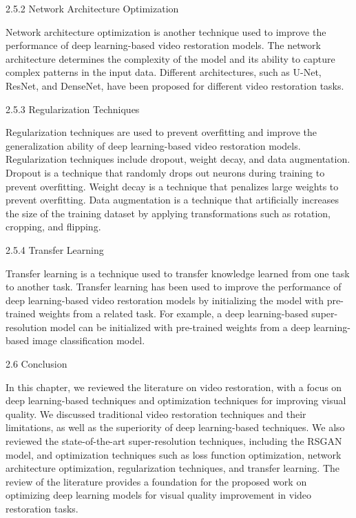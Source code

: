 2.5.2 Network Architecture Optimization

Network architecture optimization is another technique used to improve the performance of deep learning-based video restoration models. The network architecture determines the complexity of the model and its ability to capture complex patterns in the input data. Different architectures, such as U-Net, ResNet, and DenseNet, have been proposed for different video restoration tasks.

2.5.3 Regularization Techniques

Regularization techniques are used to prevent overfitting and improve the generalization ability of deep learning-based video restoration models. Regularization techniques include dropout, weight decay, and data augmentation. Dropout is a technique that randomly drops out neurons during training to prevent overfitting. Weight decay is a technique that penalizes large weights to prevent overfitting. Data augmentation is a technique that artificially increases the size of the training dataset by applying transformations such as rotation, cropping, and flipping.

2.5.4 Transfer Learning

Transfer learning is a technique used to transfer knowledge learned from one task to another task. Transfer learning has been used to improve the performance of deep learning-based video restoration models by initializing the model with pre-trained weights from a related task. For example, a deep learning-based super-resolution model can be initialized with pre-trained weights from a deep learning-based image classification model.

2.6 Conclusion

In this chapter, we reviewed the literature on video restoration, with a focus on deep learning-based techniques and optimization techniques for improving visual quality. We discussed traditional video restoration techniques and their limitations, as well as the superiority of deep learning-based techniques. We also reviewed the state-of-the-art super-resolution techniques, including the RSGAN model, and optimization techniques such as loss function optimization, network architecture optimization, regularization techniques, and transfer learning. The review of the literature provides a foundation for the proposed work on optimizing deep learning models for visual quality improvement in video restoration tasks.

